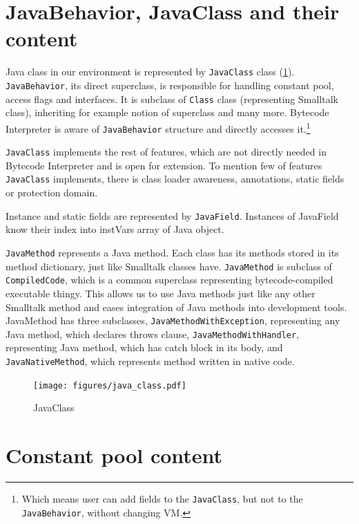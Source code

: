 \documentclass[11pt,twoside,a4paper]{book}
\begin{document}
\section{JavaBehavior, JavaClass and their content}
\label{sec:java_class}

Java class in our environment is represented by \texttt{JavaClass} class (\ref{fig:java_class}).
\texttt{JavaBehavior}, its direct superclass, is responsible for handling constant pool, access flags and interfaces.
It is subclass of \texttt{Class} class (representing Smalltalk class), inheriting for example notion of superclass and many more. 
Bytecode Interpreter is aware of \texttt{JavaBehavior} structure and directly accesses it.\footnote{Which means user can add fields to the \texttt{JavaClass}, but not to the \texttt{JavaBehavior}, without changing VM.} 

\texttt{JavaClass} implements the rest of features, which are not directly needed in Bytecode Interpreter and is open for extension.
To mention few of features \texttt{JavaClass} implements, there is class loader awareness, annotations, static fields or protection domain.

Instance and static fields are represented by \texttt{JavaField}.
Instances of JavaField know their index into instVars array of Java object. 

\texttt{JavaMethod} represents a Java method. Each class has its methods stored in its method dictionary, just like Smalltalk classes have. 
\texttt{JavaMethod} is subclass of \texttt{CompiledCode}, which is a common superclass representing bytecode-compiled executable thingy.
This allows us to use Java methods just like any other Smalltalk method and eases integration of Java methods into development tools. 
JavaMethod has three subclasses, \texttt{JavaMethodWithException}, representing any Java method, which declares throws clause, \texttt{JavaMethodWithHandler}, representing Java method, which has catch block in its body, and \texttt{JavaNativeMethod}, which represents method written in native code. 

\begin{figure}[ht]
	\begin{center}
		\texttt{[image: figures/java\_class.pdf]}
	\end{center}
	\caption{JavaClass}
	\label{fig:java_class}
\end{figure}

\section{Constant pool content}
\label{sec:constant_pool}
\end{document}
